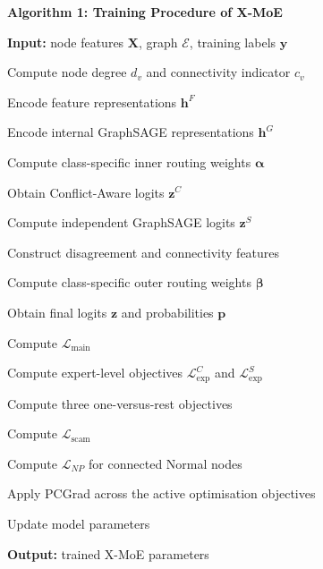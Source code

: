 \documentclass{ieeeaccess}
\begin{document}
\begin{figure}[!t]
\centering
\begin{minipage}{0.98\columnwidth}
\small
\textbf{Algorithm 1: Training Procedure of X-MoE}
\vspace{2mm}

\begin{algorithmic}[1]

\STATE \textbf{Input:} node features $\mathbf{X}$, graph $\mathcal{E}$,
training labels $\mathbf{y}$

\STATE Compute node degree $d_v$ and connectivity indicator $c_v$


    \STATE Encode feature representations $\mathbf{h}^{F}$

    \STATE Encode internal GraphSAGE representations $\mathbf{h}^{G}$

    \STATE Compute class-specific inner routing weights
    $\boldsymbol{\alpha}$

    \STATE Obtain Conflict-Aware logits $\mathbf{z}^{C}$

    \STATE Compute independent GraphSAGE logits $\mathbf{z}^{S}$

    \STATE Construct disagreement and connectivity features

    \STATE Compute class-specific outer routing weights
    $\boldsymbol{\beta}$

    \STATE Obtain final logits $\mathbf{z}$ and probabilities $\mathbf{p}$

    \STATE Compute $\mathcal{L}_{\mathrm{main}}$

    \STATE Compute expert-level objectives
    $\mathcal{L}^{C}_{\mathrm{exp}}$ and
    $\mathcal{L}^{S}_{\mathrm{exp}}$

    \STATE Compute three one-versus-rest objectives

    \STATE Compute $\mathcal{L}_{\mathrm{scam}}$

    \STATE Compute $\mathcal{L}_{NP}$ for connected Normal nodes

    \STATE Apply PCGrad across the active optimisation objectives

    \STATE Update model parameters

\ENDFOR

\STATE \textbf{Output:} trained X-MoE parameters

\end{algorithmic}
\end{minipage}
\end{figure}
\end{document}
